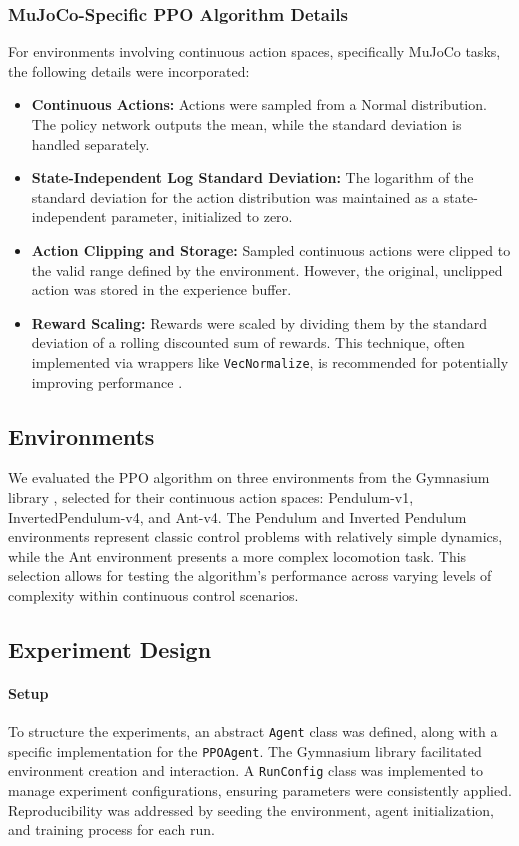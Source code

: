 \documentclass{article}
\begin{document}
\subsubsection{MuJoCo-Specific PPO Algorithm Details}
For environments involving continuous action spaces, specifically MuJoCo tasks, the following details were incorporated:
\begin{itemize}
    \item \textbf{Continuous Actions:} Actions were sampled from a Normal distribution. The policy network outputs the mean, while the standard deviation is handled separately.
    \item \textbf{State-Independent Log Standard Deviation:} The logarithm of the standard deviation for the action distribution was maintained as a state-independent parameter, initialized to zero.
    \item \textbf{Action Clipping and Storage:} Sampled continuous actions were clipped to the valid range defined by the environment. However, the original, unclipped action was stored in the experience buffer.
    \item \textbf{Reward Scaling:} Rewards were scaled by dividing them by the standard deviation of a rolling discounted sum of rewards. This technique, often implemented via wrappers like \texttt{VecNormalize}, is recommended for potentially improving performance \cite{Engstrom2020Implementation}.
\end{itemize}

\subsection{Environments}
We evaluated the PPO algorithm on three environments from the Gymnasium library \cite{towers2024gymnasium}, selected for their continuous action spaces: Pendulum-v1, InvertedPendulum-v4, and Ant-v4. The Pendulum and Inverted Pendulum environments represent classic control problems with relatively simple dynamics, while the Ant environment presents a more complex locomotion task. This selection allows for testing the algorithm's performance across varying levels of complexity within continuous control scenarios.

\subsection{Experiment Design}

\paragraph{Setup}
To structure the experiments, an abstract \texttt{Agent} class was defined, along with a specific implementation for the \texttt{PPOAgent}. The Gymnasium library facilitated environment creation and interaction. A \texttt{RunConfig} class was implemented to manage experiment configurations, ensuring parameters were consistently applied. Reproducibility was addressed by seeding the environment, agent initialization, and training process for each run.
\end{document}
